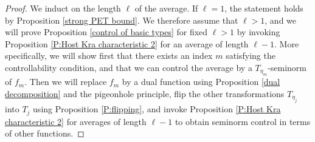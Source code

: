 \documentclass[11pt]{amsart}
\theoremstyle{definition}
\begin{document}
\begin{proof}
We induct on the length $\ell$ of the average. If $\ell = 1$, the statement holds by Proposition \ref{strong PET bound}. We therefore assume that $\ell > 1$, and we will prove Proposition \ref{control of basic types} for fixed $\ell>1$ by invoking Proposition \ref{P:Host Kra characteristic 2} for an average of length $\ell-1$. More specifically, we will show first that there exists an index $m$ satisfying the controllability condition, and that
we can control the average by a $T_{\eta_m}$-seminorm of $f_m$. Then we will replace $f_m$ by a dual function using Proposition \ref{dual decomposition} and the pigeonhole principle, flip the other transformations $T_{\eta_j}$ into $T_j$ using Proposition \ref{P:flipping}, and invoke Proposition \ref{P:Host Kra characteristic 2} for averages of length $\ell-1$ to obtain seminorm control in terms of other functions.


\end{proof}
\end{document}
